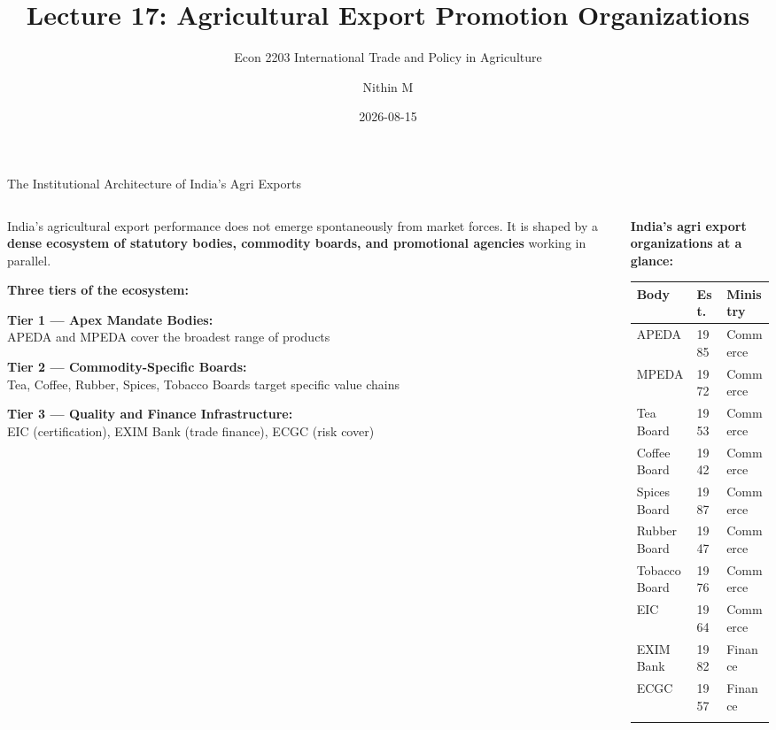 \documentclass[
  ignorenonframetext,
  aspectratio=169,
]{beamer}
\title[L17 \textbar{} Export Organizations]{Lecture 17: Agricultural
Export Promotion Organizations}
\subtitle{Econ 2203 \textbar{} International Trade and Policy in
Agriculture}
\author{Nithin M}
\date{2026-08-15}
\institute{Department of Development Economics}
\makeatletter
\let\quarto@originallabel\label
\DeclareRobustCommand*{\label}[1]{\quarto@originallabel{#1}}
\makeatother
\begin{document}
\frame{\titlepage}


\begin{frame}{The Institutional Architecture of India's Agri Exports}
\label{the-institutional-architecture-of-indias-agri-exports}
\begin{columns}[T]
\begin{column}{0.58\linewidth}
India's agricultural export performance does not emerge spontaneously
from market forces. It is shaped by a \textbf{dense ecosystem of
statutory bodies, commodity boards, and promotional agencies} working in
parallel.

\textbf{Three tiers of the ecosystem:}

\textbf{Tier 1 --- Apex Mandate Bodies:}\\
APEDA and MPEDA cover the broadest range of products

\textbf{Tier 2 --- Commodity-Specific Boards:}\\
Tea, Coffee, Rubber, Spices, Tobacco Boards target specific value chains

\textbf{Tier 3 --- Quality and Finance Infrastructure:}\\
EIC (certification), EXIM Bank (trade finance), ECGC (risk cover)
\end{column}

\begin{column}{0.42\linewidth}
\textbf{India's agri export organizations at a glance:}

\begin{longtable}[]{@{}lll@{}}
\toprule\noalign{}
Body & Est. & Ministry \\
\midrule\noalign{}
\endhead
APEDA & 1985 & Commerce \\
MPEDA & 1972 & Commerce \\
Tea Board & 1953 & Commerce \\
Coffee Board & 1942 & Commerce \\
Spices Board & 1987 & Commerce \\
Rubber Board & 1947 & Commerce \\
Tobacco Board & 1976 & Commerce \\
EIC & 1964 & Commerce \\
EXIM Bank & 1982 & Finance \\
ECGC & 1957 & Finance \\
\bottomrule\noalign{}
\end{longtable}
\end{column}
\end{columns}
\end{frame}
\end{document}
